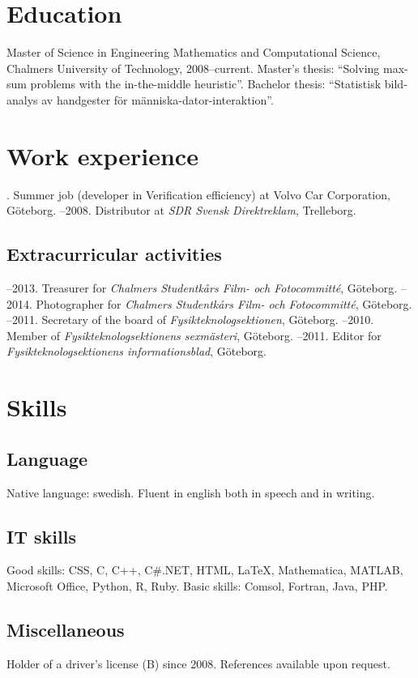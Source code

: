\documentclass{skvitae}
\author{Simon Sigurdhsson}
\affiliation{}
\begin{document}
	\maketitle

	\section{Education}
	\ind Master of Science in Engineering Mathematics and Computational Science, Chalmers University of Technology, 2008--current. %
		 Master's thesis: \enquote{Solving max-sum problems with the in-the-middle heuristic}. %
		 Bachelor thesis: \foreignquote{swedish}{Statistisk bildanalys av handgester för människa-dator-interaktion}.

	\section{Work experience}
	. Summer job (developer in Verification efficiency) at Volvo Car Corporation, Göteborg.
	--2008. Distributor at \emph{SDR Svensk Direktreklam}, Trelleborg.

	\medskip
	\subsection{Extracurricular activities}
	--2013. Treasurer for \emph{Chalmers Studentkårs Film- och Fotocommitté}, Göteborg.
	--2014. Photographer for \emph{Chalmers Studentkårs Film- och Fotocommitté}, Göteborg.
	--2011. Secretary of the board of \emph{Fysikteknologsektionen}, Göteborg.
	--2010. Member of \emph{Fysikteknologsektionens sexmästeri}, Göteborg.
	--2011. Editor for \emph{Fysikteknologsektionens informationsblad}, Göteborg.

	\section{Skills}
	\subsection{Language}
	\ind Native language: swedish. Fluent in english both in speech and in writing.

	\medskip
	\subsection{IT skills}
	\ind Good skills: CSS, C, C++, C\#.NET, HTML, \LaTeX, Mathematica, MATLAB, Microsoft Office, Python, R, Ruby.
	\ind Basic skills: Comsol, Fortran, Java, PHP.

	\medskip
	\subsection{Miscellaneous}
	\ind Holder of a driver's license (B) since 2008.
	\ind References available upon request.
\end{document}
